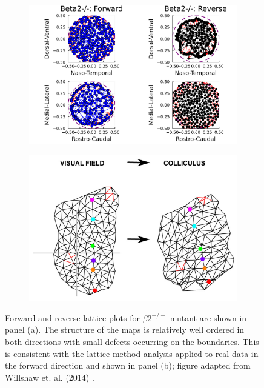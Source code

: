 \begin{figure}
	\begin{subfigure}{0.6\textwidth}
		\centering
		\includegraphics[width=\textwidth]{images/distributed_kernels/figure_lattice_Beta2}	
		\caption{}
	\end{subfigure}
	\begin{subfigure}{0.4\textwidth}
		\centering
		\includegraphics[width=\textwidth]{images/distributed_kernels/latticeB2}	
		\caption{}
	\end{subfigure}
	\def\c{Forward and reverse lattice plots for $\beta2^{-/-}$ mutant are shown.}
	\caption[\c]{\label{fig:beta2lattice} Forward and reverse lattice plots for $\beta2^{-/-}$ mutant are shown in panel (a). The structure of the maps is relatively well ordered in both directions with small defects occurring on the boundaries. This is consistent with the lattice method analysis applied to real data in the forward direction and shown in panel (b); figure adapted from Willshaw et. al. (2014) \cite{Willshaw2014-ms}.}
\end{figure}


